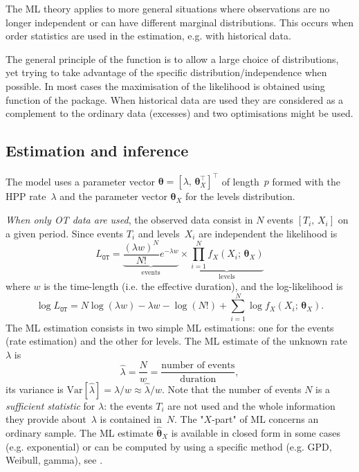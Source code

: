 \documentclass[a4paper]{report}
\newcommand{\Var}{\textrm{Var}}
\newcommand{\bs}{\boldsymbol}
\begin{document}
The ML theory applies to more general situations where observations are
no longer independent or can have different marginal distributions. This 
occurs when order statistics are used in the estimation, e.g. with 
historical data.
%

The general principle of the \verb@Renouv@ function is to allow a large choice
of distributions, yet trying to take advantage of the specific distribution/independence 
when possible. In most cases the maximisation of the likelihood is obtained using 
\verb@optim@ function of the \verb@stats@ package. When historical data are used
they are considered as a complement to the ordinary data (excesses) 
and two optimisations might be used. 

\subsection{Estimation and inference}
The model uses a parameter vector $\bs{\theta} =
[\lambda,\,\bs{\theta}_X^\top ]^\top$ of length~$p$ formed with the
HPP rate~$\lambda$ and the parameter vector $\bs{\theta}_X$ for the
levels distribution.

\textit{When only OT data are used}, the observed data consist in $N$ events 
$[T_i,\,X_i]$ on a given period. Since events $T_i$
and levels~$X_i$ are independent the likelihood is
$$
   L_{\texttt{OT}} = 
   \underset{\mathrm{events}}{\underbrace{\frac{(\lambda w)^N}{N!} e^{-\lambda w}}}
   \times 
   \underset{\mathrm{levels}}{\underbrace{\prod_{i=1}^N f_X(X_i;\,\bs{\theta}_X)}}
$$
where $w$ is the time-length (i.e. the effective duration), and the log-likelihood is
\begin{equation}
  \label{eq:LLstand}
  \log L_{\texttt{OT}}  = N\log(\lambda w) - \lambda w 
    - \log(N!)+ \sum_{i=1}^N \log f_X(X_i;\,\bs{\theta}_X). 
\end{equation}
The ML estimation consists in two simple ML estimations: one for the events 
(rate estimation) and the other for levels. The ML estimate of the unknown rate $\lambda$ is
$$
     \widehat{\lambda} = \frac{N}{w}= \frac{\textrm{number of events}}{\textrm{duration}},
$$
its variance is $\Var[\widehat{\lambda}]= \lambda/w \approx
\widehat{\lambda}/w$.  Note that the number of events $N$ is a
\textit{sufficient statistic} for $\lambda$: the events $T_i$ are not
used and the whole information they provide about~$\lambda$ is
contained in~$N$.  The "$X$-part" of ML concerns an ordinary
sample. The ML estimate $\widehat{\bs{\theta}}_X$ is available in
closed form in some cases (e.g. exponential) or can be computed by
using a specific method (e.g.  GPD, Weibull, gamma), see
\citet{RenCompDet}.
\end{document}
